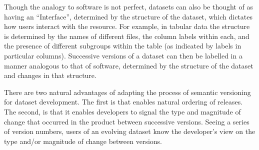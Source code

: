 \documentclass[a4paper,num-refs]{oup-contemporary}
\begin{document}
Though the analogy to software is not perfect, datasets can also be thought of as having an ``Interface'', determined by the structure of the dataset, which dictates how users interact with the resource. For example, in tabular data the structure is determined by the names of different files, the column labels within each, and the presence of different subgroups within the table (as indicated by labels in particular columns). Successive versions of a dataset can then be labelled in a manner analogous to that of software, determined by the structure of the dataset and changes in that structure.

There are two natural advantages of adapting the process of semantic versioning for dataset development. The first is that enables natural ordering of releases. The second, is that it enables developers to signal the type and magnitude of change that occurred in the product between successive versions. Seeing a series of version numbers, users of an evolving dataset know the developer's view on the type and/or magnitude of change between versions.
\end{document}
